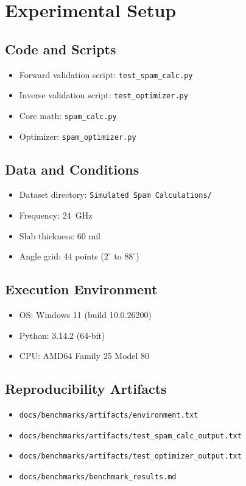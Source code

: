 \documentclass[11pt]{article}
\begin{document}
\section{Experimental Setup}

\subsection{Code and Scripts}
\begin{itemize}
    \item Forward validation script: \texttt{test\_spam\_calc.py}
    \item Inverse validation script: \texttt{test\_optimizer.py}
    \item Core math: \texttt{spam\_calc.py}
    \item Optimizer: \texttt{spam\_optimizer.py}
\end{itemize}

\subsection{Data and Conditions}
\begin{itemize}
    \item Dataset directory: \texttt{Simulated Spam Calculations/}
    \item Frequency: \SI{24}{\giga\hertz}
    \item Slab thickness: 60 mil
    \item Angle grid: 44 points (\(2^\circ\) to \(88^\circ\))
\end{itemize}

\subsection{Execution Environment}
\begin{itemize}
    \item OS: Windows 11 (build 10.0.26200)
    \item Python: 3.14.2 (64-bit)
    \item CPU: AMD64 Family 25 Model 80
\end{itemize}

\subsection{Reproducibility Artifacts}
\begin{itemize}
    \item \texttt{docs/benchmarks/artifacts/environment.txt}
    \item \texttt{docs/benchmarks/artifacts/test\_spam\_calc\_output.txt}
    \item \texttt{docs/benchmarks/artifacts/test\_optimizer\_output.txt}
    \item \texttt{docs/benchmarks/benchmark\_results.md}
\end{itemize}
\end{document}
